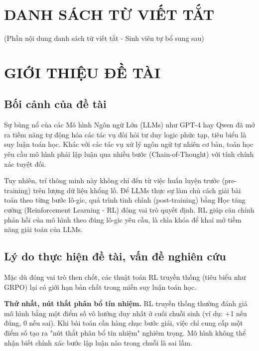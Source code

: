 \documentclass[12pt,a4paper]{report}
\begin{document}
\chapter*{DANH SÁCH TỪ VIẾT TẮT}
(Phần nội dung danh sách từ viết tắt - Sinh viên tự bổ sung sau)

\tableofcontents
\listoffigures
\listoftables

\clearpage
{} %

\chapter{GIỚI THIỆU ĐỀ TÀI}

\section{Bối cảnh của đề tài}
Sự bùng nổ của các Mô hình Ngôn ngữ Lớn (LLMs) như GPT-4 hay Qwen đã mở ra tiềm năng tự động hóa các tác vụ đòi hỏi tư duy logic phức tạp, tiêu biểu là suy luận toán học. Khác với các tác vụ xử lý ngôn ngữ tự nhiên cơ bản, toán học yêu cầu mô hình phải lập luận qua nhiều bước (Chain-of-Thought) với tính chính xác tuyệt đối. 

Tuy nhiên, trí thông minh này không chỉ đến từ việc huấn luyện trước (pre-training) trên lượng dữ liệu khổng lồ. Để LLMs thực sự làm chủ cách giải bài toán theo từng bước lô-gic, quá trình tinh chỉnh (post-training) bằng Học tăng cường (Reinforcement Learning - RL) đóng vai trò quyết định. RL giúp căn chỉnh phản hồi của mô hình theo đúng lô-gic yêu cầu, là chìa khóa để khai mở tiềm năng giải toán của LLMs.

\section{Lý do thực hiện đề tài, vấn đề nghiên cứu}
Mặc dù đóng vai trò then chốt, các thuật toán RL truyền thống (tiêu biểu như GRPO) lại có giới hạn bản chất trong miền suy luận toán học.

\textbf{Thứ nhất, nút thắt phân bổ tín nhiệm.} RL truyền thống thường đánh giá mô hình bằng một điểm số vô hướng duy nhất ở cuối chuỗi sinh (ví dụ: +1 nếu đúng, 0 nếu sai). Khi bài toán cần hàng chục bước giải, việc chỉ cung cấp một điểm số tạo ra "nút thắt phân bổ tín nhiệm" nghiêm trọng. Mô hình không thể nhận biết chính xác bước lập luận nào trong chuỗi là sai lầm.
\end{document}
